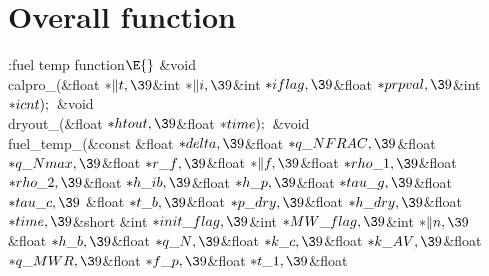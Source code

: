 \documentclass[letterpaper,12pt,baseclass=report]{cweb-hy}
\begin{document}
{\section{Overall function}

\Y\B\4:fuel temp function\X${}\E{}$\6
\&{void} \\{calpro\_}(\&{float} ${}{*}\|t,\39{}$\&{int} ${}{*}\|i,\39{}$\&{int}
${}{*}\\{iflag},\39{}$\&{float} ${}{*}\\{prpval},\39{}$\&{int} ${}{*}%
\\{icnt});{}$\6
\&{void} \\{dryout\_}(\&{float} ${}{*}\\{htout},\39{}$\&{float} ${}{*}%
\\{time});{}$\7
\&{void} \\{fuel\_temp\_}(\&{const} \&{float} ${}{*}\\{delta},\39{}$\&{float}
${}{*}\\{q\_NFRAC},\39{}$\&{float} ${}{*}\\{q\_Nmax},\39{}$\&{float} ${}{*}\\{r%
\_f},\39{}$\&{float} ${}{*}\|f,\39{}$\&{float} ${}{*}\\{rho\_1},\39{}$\&{float}
${}{*}\\{rho\_2},\39{}$\&{float} ${}{*}\\{h\_ib},\39{}$\&{float} ${}{*}\\{h%
\_p},\39{}$\&{float} ${}{*}\\{tau\_g},\39{}$\&{float} ${}{*}\\{tau\_c},\39{}$%
\&{float} ${}{*}\\{t\_b},\39{}$\&{float} ${}{*}\\{p\_dry},\39{}$\&{float}
${}{*}\\{h\_dry},\39{}$\&{float} ${}{*}\\{time},\39{}$\&{short} \&{int} ${}{*}%
\\{init\_flag},\39{}$\&{int} ${}{*}\\{MW\_flag},\39{}$\&{int} ${}{*}\|n,\39{}$%
\&{float} ${}{*}\\{h\_b},\39{}$\&{float} ${}{*}\\{q\_N},\39{}$\&{float} ${}{*}%
\\{k\_c},\39{}$\&{float} ${}{*}\\{k\_AV},\39{}$\&{float} ${}{*}\\{q\_MWR},%
\39{}$\&{float} ${}{*}\\{f\_p},\39{}$\&{float} ${}{*}\\{t\_1},\39{}$\&{float}
}
\end{document}
